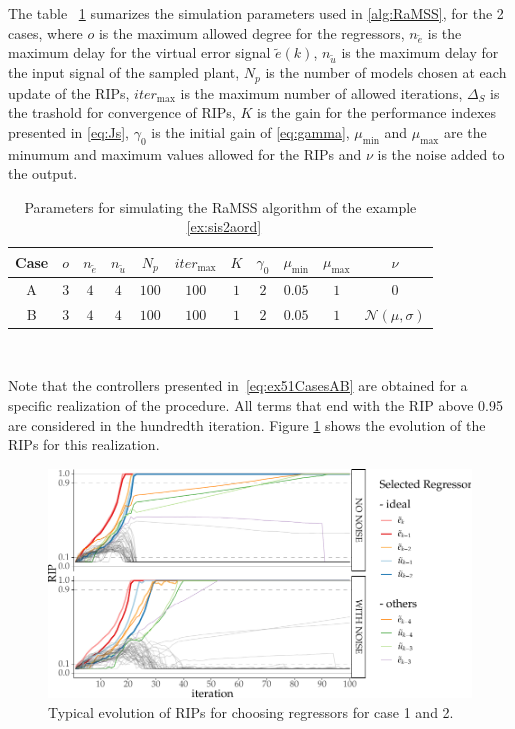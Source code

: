 \begin{exmp}
The table ~\ref{tab:exp51_param} sumarizes the simulation parameters used in \ref{alg:RaMSS}, for the 2 cases,
where $o$ is the maximum allowed degree for the regressors, $n_{\tilde{e}}$ is the maximum delay for the virtual error signal $\tilde{e}(k)$, $n_{\tilde{u}}$ is the maximum delay for the input signal of the sampled plant, $ N_p$ is the number of models chosen at each update of the RIPs, $ iter_{\max} $ is the maximum number of allowed iterations, $\Delta_S$ is the trashold for convergence of RIPs, $K$ is the gain for the performance indexes presented in \ref{eq:Js}, $\gamma_0$ is the initial gain of \ref{eq:gamma}, $\mu_{\min}$ and $\mu_{\max}$ are the minumum and maximum values allowed for the RIPs and $\nu$ is the noise added to the output.
\begin{table}[htpb]
  \centering
  \caption{Parameters for simulating the RaMSS algorithm of the example ~\ref{ex:sis2aord}}\label{tab:exp51_param}
  \begin{tabular}{c|c|c|c|c|c|c|c|c|c|c}
    Case & $o$ & $n_{\tilde{e}}$ & $n_{\tilde{u}}$ & $ N_p$ & $ iter_{\max} $ & $K$ & $\gamma_0$ &  $\mu_{\min}$ & $\mu_{\max}$ & $\nu$\\
    \hline
    A & $ 3 $ & $4$ & $4$ & $100$ & $100$ & $1$ & $2$ & $0.05$ & $1$ & $0$ \\
    B & $ 3 $ & $4$ & $4$ & $100$ & $100$ & $1$ & $2$ & $0.05$ & $1$ & $\mathcal{N}(\mu,\sigma)$
  \end{tabular}
\end{table}\\

Note that the controllers presented in~\eqref{eq:ex51CasesAB} are obtained for a specific realization of the procedure. All terms that end with the RIP above 0.95 are considered in the hundredth iteration.
Figure \ref{fig:ex51_RIPevol_2cases} shows the evolution of the RIPs for this realization.

\begin{figure}[H]
  \centering
  \includegraphics[width=\textwidth]{Figs/Cap5/ex51_rips.tex.pdf}
  \caption{Typical evolution of RIPs for choosing regressors for case 1 and 2.}
  \label{fig:ex51_RIPevol_2cases}
\end{figure}


\end{exmp}
